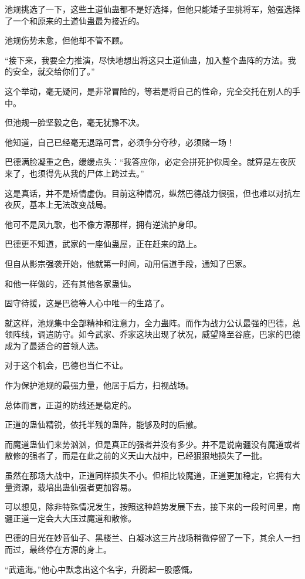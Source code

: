 \begin{this_body}
池规挑选了一下，这些土道仙蛊都不是好选择，但他只能矮子里挑将军，勉强选择了一个和原来的土道仙蛊最为接近的。

池规伤势未愈，但他却不管不顾。

“接下来，我要全力推演，尽快地想出将这只土道仙蛊，加入整个蛊阵的方法。我的安全，就交给你们了。”

这个举动，毫无疑问，是非常冒险的，等若是将自己的性命，完全交托在别人的手中。

但池规一脸坚毅之色，毫无犹豫不决。

他知道，自己已经毫无退路可言，必须争分夺秒，必须赌一场！

巴德满脸凝重之色，缓缓点头：“我答应你，必定会拼死护你周全。就算是左夜灰来了，也须得先从我的尸体上跨过去。”

这是真话，并不是矫情虚伪。目前这种情况，纵然巴德战力很强，但也难以对抗左夜灰，基本上无法改变战局。

他可不是凤九歌，也不像方源那样，拥有逆流护身印。

巴德更不知道，武家的一座仙蛊屋，正在赶来的路上。

但自从影宗强袭开始，他就第一时间，动用信道手段，通知了巴家。

和他一样做的，还有其他各家蛊仙。

固守待援，这是巴德等人心中唯一的生路了。

就这样，池规集中全部精神和注意力，全力蛊阵。而作为战力公认最强的巴德，总领阵线，调遣防守。如今武家、乔家这块出现了状况，威望降至谷底，巴家的巴德成为了最适合的首领人选。

对于这个机会，巴德也当仁不让。

作为保护池规的最强力量，他居于后方，扫视战场。

总体而言，正道的防线还是稳定的。

正道的蛊仙精锐，依托半残的蛊阵，能够及时的后撤。

而魔道蛊仙们来势汹汹，但是真正的强者并没有多少。并不是说南疆没有魔道或者散修的强者了，而是在此之前的义天山大战中，已经狠狠地损失了一批。

虽然在那场大战中，正道同样损失不小。但相比较魔道，正道更加稳定，它拥有大量资源，栽培出蛊仙强者更加容易。

可以想见，除非特殊情况发生，按照这种趋势发展下去，接下来的一段时间里，南疆正道一定会大大压过魔道和散修。

巴德的目光在妙音仙子、黑楼兰、白凝冰这三片战场稍微停留了一下，其余人一扫而过，最终停在方源的身上。

“武遗海。”他心中默念出这个名字，升腾起一股感慨。


\end{this_body}
